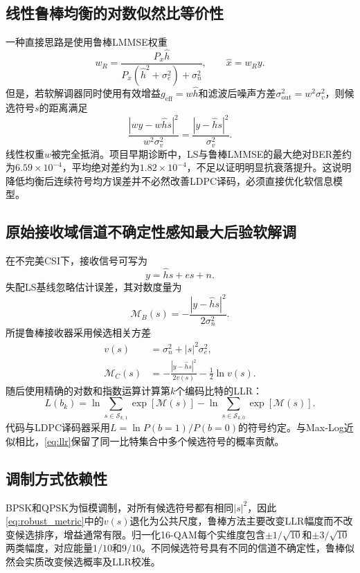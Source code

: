 \documentclass[UTF8,a4paper,11pt]{ctexart}
\newcommand{\CSI}{CSI}
\newcommand{\BER}{BER}
\newcommand{\LLR}{LLR}
\newcommand{\LDPC}{LDPC}
\begin{document}
\subsection{线性鲁棒均衡的对数似然比等价性}
一种直接思路是使用鲁棒LMMSE权重
\begin{equation}
  w_R=\frac{P_x\hat h}
  {P_x(\hat h^2+\sigma_e^2)+\sigma_n^2},
  \qquad
  \hat x=w_Ry.
  \label{eq:robust_lmmse}
\end{equation}
但是，若软解调器同时使用有效增益$g_{\mathrm{eff}}=w\hat h$和滤波后噪声方差$\sigma_{\mathrm{out}}^2=w^2\sigma_v^2$，则候选符号$s$的距离满足
\begin{equation}
  \frac{|wy-w\hat hs|^2}{w^2\sigma_v^2}
  =\frac{|y-\hat hs|^2}{\sigma_v^2}.
  \label{eq:weight_cancel}
\end{equation}
线性权重$w$被完全抵消。项目早期诊断中，LS与鲁棒LMMSE的最大绝对\BER{}差约为$6.59\times10^{-4}$，平均绝对差约为$1.82\times10^{-4}$，不足以证明明显抗衰落提升。这说明降低均衡后连续符号均方误差并不必然改善\LDPC{}译码，必须直接优化软信息模型。

\subsection{原始接收域信道不确定性感知最大后验软解调}
在不完美\CSI{}下，接收信号可写为
\begin{equation}
  y=\hat hs+es+n.
  \label{eq:raw_receive}
\end{equation}
失配LS基线忽略估计误差，其对数度量为
\begin{equation}
  \mathcal M_B(s)
  =-\frac{|y-\hat hs|^2}{2\sigma_n^2}.
  \label{eq:mismatched_metric}
\end{equation}
所提鲁棒接收器采用候选相关方差
\begin{align}
  v(s)&=\sigma_n^2+|s|^2\sigma_e^2, \\
  \mathcal M_C(s)
  &=-\frac{|y-\hat hs|^2}{2v(s)}
  -\frac{1}{2}\ln v(s).
  \label{eq:robust_metric}
\end{align}
随后使用精确的对数和指数运算计算第$k$个编码比特的\LLR{}：
\begin{equation}
  L(b_k)
  =\ln\!\sum_{s\in\mathcal S_{k,1}}\!\exp[\mathcal M(s)]
  -\ln\!\sum_{s\in\mathcal S_{k,0}}\!\exp[\mathcal M(s)].
  \label{eq:llr}
\end{equation}
代码与\LDPC{}译码器采用$L=\ln P(b=1)/P(b=0)$的符号约定。与Max-Log近似相比，\cref{eq:llr}保留了同一比特集合中多个候选符号的概率贡献。

\subsection{调制方式依赖性}
BPSK和QPSK为恒模调制，对所有候选符号都有相同$|s|^2$，因此\cref{eq:robust_metric}中的$v(s)$退化为公共尺度，鲁棒方法主要改变\LLR{}幅度而不改变候选排序，增益通常有限。归一化16-QAM每个实维度包含$\pm1/\sqrt{10}$和$\pm3/\sqrt{10}$两类幅度，对应能量$1/10$和$9/10$。不同候选符号具有不同的信道不确定性，鲁棒似然会实质改变候选概率及\LLR{}校准。
\end{document}
